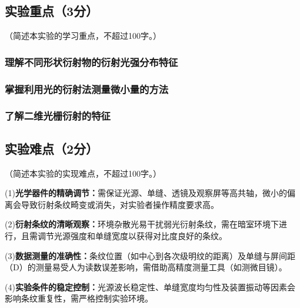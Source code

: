 \documentclass[]{../模板/Report}%
\begin{document}
\subsection{实验重点（3分）}
（简述本实验的学习重点，不超过100字。）
\subsubsection{理解不同形状衍射物的衍射光强分布特征}

\subsubsection{掌握利用光的衍射法测量微小量的方法}

\subsubsection{了解二维光栅衍射的特征}


\subsection{实验难点（2分）}
（简述本实验的实现难点，不超过100字。）
\par
(1)\textbf{光学器件的精确调节：}需保证光源、单缝、透镜及观察屏等高共轴，微小的偏离会导致衍射条纹畸变或消失，对实验者操作精度要求高。
\par
(2)\textbf{衍射条纹的清晰观察：}环境杂散光易干扰弱光衍射条纹，需在暗室环境下进行，且需调节光源强度和单缝宽度以获得对比度良好的条纹。
\par
(3)\textbf{数据测量的准确性：}条纹位置（如中心到各次级明纹的距离）及单缝与屏间距（D）的测量易受人为读数误差影响，需借助高精度测量工具（如测微目镜）。
\par
(4)\textbf{实验条件的稳定控制：}光源波长稳定性、单缝宽度均匀性及装置振动等因素会影响条纹重复性，需严格控制实验环境。
\end{document}
